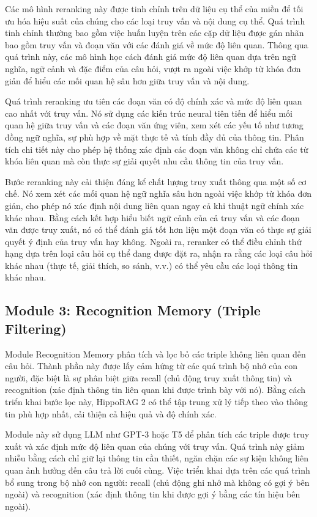 \documentclass[../main.tex]{subfiles}
\begin{document}
Các mô hình reranking này được tinh chỉnh trên dữ liệu cụ thể của miền để tối ưu hóa hiệu suất của chúng cho các loại truy vấn và nội dung cụ thể. Quá trình tinh chỉnh thường bao gồm việc huấn luyện trên các cặp dữ liệu được gán nhãn bao gồm truy vấn và đoạn văn với các đánh giá về mức độ liên quan. Thông qua quá trình này, các mô hình học cách đánh giá mức độ liên quan dựa trên ngữ nghĩa, ngữ cảnh và đặc điểm của câu hỏi, vượt ra ngoài việc khớp từ khóa đơn giản để hiểu các mối quan hệ sâu hơn giữa truy vấn và nội dung.

Quá trình reranking ưu tiên các đoạn văn có độ chính xác và mức độ liên quan cao nhất với truy vấn. Nó sử dụng các kiến trúc neural tiên tiến để hiểu mối quan hệ giữa truy vấn và các đoạn văn ứng viên, xem xét các yếu tố như tương đồng ngữ nghĩa, sự phù hợp về mặt thực tế và tính đầy đủ của thông tin. Phân tích chi tiết này cho phép hệ thống xác định các đoạn văn không chỉ chứa các từ khóa liên quan mà còn thực sự giải quyết nhu cầu thông tin của truy vấn.

Bước reranking này cải thiện đáng kể chất lượng truy xuất thông qua một số cơ chế. Nó xem xét các mối quan hệ ngữ nghĩa sâu hơn ngoài việc khớp từ khóa đơn giản, cho phép nó xác định nội dung liên quan ngay cả khi thuật ngữ chính xác khác nhau. Bằng cách kết hợp hiểu biết ngữ cảnh của cả truy vấn và các đoạn văn được truy xuất, nó có thể đánh giá tốt hơn liệu một đoạn văn có thực sự giải quyết ý định của truy vấn hay không. Ngoài ra, reranker có thể điều chỉnh thứ hạng dựa trên loại câu hỏi cụ thể đang được đặt ra, nhận ra rằng các loại câu hỏi khác nhau (thực tế, giải thích, so sánh, v.v.) có thể yêu cầu các loại thông tin khác nhau.

\subsection{Module 3: Recognition Memory (Triple Filtering)}
Module Recognition Memory phân tích và lọc bỏ các triple không liên quan đến câu hỏi. Thành phần này được lấy cảm hứng từ các quá trình bộ nhớ của con người, đặc biệt là sự phân biệt giữa recall (chủ động truy xuất thông tin) và recognition (xác định thông tin liên quan khi được trình bày với nó). Bằng cách triển khai bước lọc này, HippoRAG 2 có thể tập trung xử lý tiếp theo vào thông tin phù hợp nhất, cải thiện cả hiệu quả và độ chính xác.

Module này sử dụng LLM như GPT-3 hoặc T5 để phân tích các triple được truy xuất và xác định mức độ liên quan của chúng với truy vấn. Quá trình này giảm nhiễu bằng cách chỉ giữ lại thông tin cần thiết, ngăn chặn các sự kiện không liên quan ảnh hưởng đến câu trả lời cuối cùng. Việc triển khai dựa trên các quá trình bổ sung trong bộ nhớ con người: recall (chủ động ghi nhớ mà không có gợi ý bên ngoài) và recognition (xác định thông tin khi được gợi ý bằng các tín hiệu bên ngoài).
\end{document}
